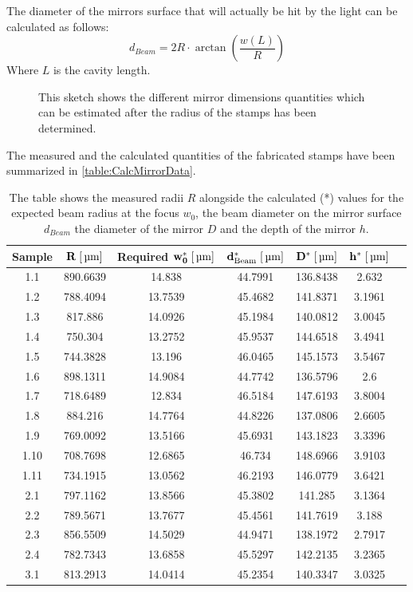 The diameter of the mirrors surface that will actually be hit by the light can be calculated as follows:
\begin{equation}
	d_{\si{Beam}}=2R\cdot \arctan\left(\frac{w(L)}{R}\right)
\end{equation}
Where $L$ is the cavity length.
\begin{figure}[H]
	
	\caption{This sketch shows the different mirror dimensions quantities which can be estimated after the radius of the stamps has been determined.}
\end{figure}
The measured and the calculated quantities of the fabricated stamps have been summarized in \autoref{table:CalcMirrorData}.
\begin{table}[H]
	\begin{tabular}{ccccccc}
	\hline
\textbf{Sample} & \textbf{$\mathbf{R\;[\um]}$} & \textbf{Required $\mathbf{w_0^*\;[\um]}$} & \textbf{$\mathbf{d_{\si{Beam}}^*\;[\um]}$} & \textbf{$\mathbf{D^*\;[\um]}$} & \textbf{$\mathbf{h^*\;[\um]}$} \\
	\hline
	1.1 & 890.6639 & 14.838 & 44.7991 & 136.8438 & 2.632 \\
	1.2 & 788.4094 & 13.7539 & 45.4682 & 141.8371 & 3.1961 \\
	1.3 & 817.886 & 14.0926 & 45.1984 & 140.0812 & 3.0045 \\
	1.4 & 750.304 & 13.2752 & 45.9537 & 144.6518 & 3.4941 \\
	1.5 & 744.3828 & 13.196 & 46.0465 & 145.1573 & 3.5467 \\
	1.6 & 898.1311 & 14.9084 & 44.7742 & 136.5796 & 2.6 \\
	1.7 & 718.6489 & 12.834 & 46.5184 & 147.6193 & 3.8004 \\
	1.8 & 884.216 & 14.7764 & 44.8226 & 137.0806 & 2.6605 \\
	1.9 & 769.0092 & 13.5166 & 45.6931 & 143.1823 & 3.3396 \\
	1.10 & 708.7698 & 12.6865 & 46.734 & 148.6966 & 3.9103 \\
	1.11 & 734.1915 & 13.0562 & 46.2193 & 146.0779 & 3.6421 \\
	2.1 & 797.1162 & 13.8566 & 45.3802 & 141.285 & 3.1364 \\
	2.2 & 789.5671 & 13.7677 & 45.4561 & 141.7619 & 3.188 \\
	2.3 & 856.5509 & 14.5029 & 44.9471 & 138.1972 & 2.7917 \\
	2.4 & 782.7343 & 13.6858 & 45.5297 & 142.2135 & 3.2365 \\
	3.1 & 813.2913 & 14.0414 & 45.2354 & 140.3347 & 3.0325 \\
	\hline
\end{tabular}
	\caption{The table shows the measured radii $R$ alongside the calculated (*) values for the expected beam radius at the focus $w_0$, the beam diameter on the mirror surface $d_{\si{Beam}}$ the diameter of the mirror $D$ and the depth of the mirror $h$.}
	\label{table:CalcMirrorData}
\end{table}

